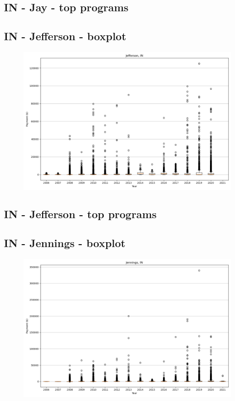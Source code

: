 \subsection*{IN - Jay - top programs}

\newpage
\subsection*{IN - Jefferson - boxplot}
\begin{figure}[h]
\centering
\includegraphics[width=7in]{../output/boxplots/counties/Jefferson-IN_boxplot.png}
\end{figure}


\subsection*{IN - Jefferson - top programs}

\newpage
\subsection*{IN - Jennings - boxplot}
\begin{figure}[h]
\centering
\includegraphics[width=7in]{../output/boxplots/counties/Jennings-IN_boxplot.png}
\end{figure}


